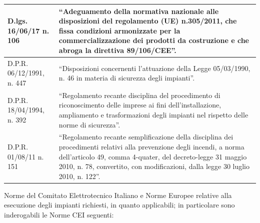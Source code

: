 \begin{longtable}{|p{4.2cm}|p{9.5cm}|}
\hline
D.lgs. 16/06/17 n. 106 & ``Adeguamento della normativa nazionale alle disposizioni del regolamento (UE) n.305/2011, che fissa condizioni armonizzate per la commercializzazione dei prodotti da costruzione e che abroga la direttiva 89/106/CEE''. \\
\hline
D.P.R. 06/12/1991, n. 447 & ``Disposizioni concernenti l'attuazione della Legge 05/03/1990, n. 46 in materia di sicurezza degli impianti''. \\
\hline
D.P.R. 18/04/1994, n. 392 & ``Regolamento recante disciplina del procedimento di riconoscimento delle imprese ai fini dell'installazione, ampliamento e trasformazioni degli impianti nel rispetto delle norme di sicurezza''. \\
\hline
D.P.R. 01/08/11 n. 151 & ``Regolamento recante semplificazione della disciplina dei procedimenti relativi alla prevenzione degli incendi, a norma dell'articolo 49, comma 4-quater, del decreto-legge 31 maggio 2010, n. 78, convertito, con modificazioni, dalla legge 30 luglio 2010, n. 122''. \\
\hline
\end{longtable}


\hspace{1em}
Norme del Comitato Elettrotecnico Italiano e Norme Europee relative alla esecuzione degli impianti richiesti, in quanto applicabili; in particolare sono inderogabili le Norme CEI seguenti:

